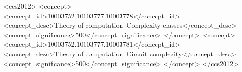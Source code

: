 \begin{CCSXML}
<ccs2012>
<concept>
<concept_id>10003752.10003777.10003778</concept_id>
<concept_desc>Theory of computation~Complexity classes</concept_desc>
<concept_significance>500</concept_significance>
</concept>
<concept>
<concept_id>10003752.10003777.10003781</concept_id>
<concept_desc>Theory of computation~Circuit complexity</concept_desc>
<concept_significance>500</concept_significance>
</concept>
</ccs2012>
\end{CCSXML}



